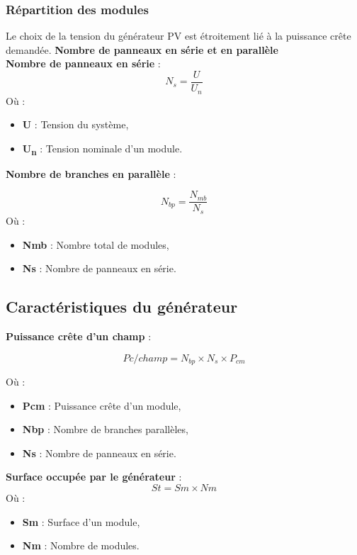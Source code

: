 \subsubsection{Répartition des modules}

Le choix de la tension du générateur PV est étroitement lié à la puissance crête demandée. 
\textbf{Nombre de panneaux en série et en parallèle}\\

\textbf{Nombre de panneaux en série} :
	\begin{equation}
N_s = \frac{U}{U_n}
\end{equation}
Où :
	\begin{itemize}
	\item \textbf{U} : Tension du système,
	\item \textbf{U\textsubscript{n}} : Tension nominale d'un module.
\end{itemize}


\textbf{Nombre de branches en parallèle} :

	\begin{equation}
N_{bp} = \frac{N_{mb}}{N_s}
\end{equation}
Où : 

	\begin{itemize}
	\item \textbf{Nmb} : Nombre total de modules,
	\item \textbf{Ns} : Nombre de panneaux en série.
\end{itemize}


\subsection{Caractéristiques du générateur}

\textbf{Puissance crête d’un champ} :

	\begin{equation}
Pc/champ = N_{bp} \times N_s \times P_{cm}
\end{equation}

Où :
	\begin{itemize}
	\item \textbf{Pcm} : Puissance crête d’un module,
	\item \textbf{Nbp} : Nombre de branches parallèles,
	\item \textbf{Ns} : Nombre de panneaux en série.
\end{itemize}

\textbf{Surface occupée par le générateur} :
	\begin{equation}
St = Sm \times Nm
\end{equation}
Où :
	\begin{itemize}
	\item \textbf{Sm} : Surface d’un module,
	\item \textbf{Nm} : Nombre de modules.
\end{itemize}


